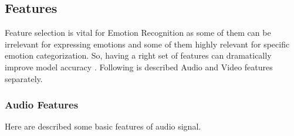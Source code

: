 \documentclass[oneside]{report}
\begin{document}
    
    
\subsection{Features}

    Feature selection is vital for Emotion Recognition as some of them can be  irrelevant for expressing emotions and some of them highly relevant for specific emotion categorization. So, having a right set of features can dramatically improve model accuracy \cite{google_survey}. Following is described Audio and Video features separately. 
    
    \subsubsection{Audio Features}
    
        Here are described some basic features of audio signal.
    
\end{document}
